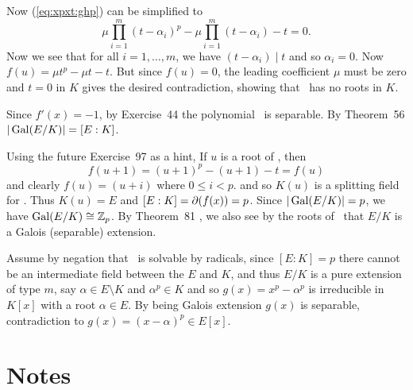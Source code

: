 \begin{myenumerate}
Now (\ref{eq:xpxt:ghp}) can be simplified to
\begin{equation*}
 \mu \prod_{i=1}^m (t - \alpha_i)^p - \mu \prod_{i=1}^m (t - \alpha_i) - t = 0.
\end{equation*}
Now we see that for all \(i = 1,\ldots,m\),
we have \((t - \alpha_i) \mid t \) and so \(\alpha_i = 0\).
Now \(f(u) = \mu t^p - \mu t - t\).
But since \(f(u) = 0\), the leading coefficient \(\mu\) must be zero
and \(t=0\) in $K$ gives the desired contradiction,
showing that \fx\ has no roots in $K$.

Since \(f'(x) = -1\),
by Exercise~44 \cite{Rotman98}
the polynomial \fx\ is separable.
By Theorem~56 \cite{Rotman98} \(|\mathop{\rm Gal}\nolimits(E/K)| = [E:K]\).

Using the future Exercise~97 as a hint,
If $u$ is a root of \fx, then
\begin{equation} \label{eq:fu:fu1}
f(u+1) = (u+1)^p - (u+1) - t = f(u)
\end{equation}
and clearly \(f(u) = (u+i)\)  where \(0 \leq i < p\).
and so \(K(u)\) is a splitting field for \fx. Thus \(K(u)=E\)
and \([E:K] = \partial(f(x)) = p\).
Since \(|\mathop{\rm Gal}\nolimits(E/K)| = p\), we have \(\mathop{\rm Gal}\nolimits(E/K) \cong \mathbb{Z}_p\).
By Theorem~81 \cite{Rotman98},
we also see by the roots of \fx\ that \(E/K\)
is a Galois (separable) extension.

Assume by negation that \fx\ is solvable by radicals, since \([E:K]=p\)
there cannot be an intermediate field between the $E$ and $K$,
and thus \(E/K\) is a pure extension of type $m$,
say \(\alpha\in E\setminus K\)
and \(\alpha^p\in K\) and so
\(g(x)=x^p-\alpha^p\) is irreducible in \(K[x]\) with a root \(\alpha\in E\).
By being Galois extension \(g(x)\) is separable, contradiction to
\(g(x)=(x-\alpha)^p \in E[x]\).


\end{myenumerate}



\section{Notes}

